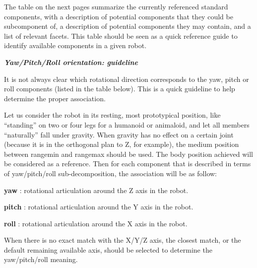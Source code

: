 \documentclass[a4paper]{article}
\begin{document}
{\sffamily
The table on the next pages summarize the currently referenced standard
components, with a description of potential components that they could
be subcomponent of, a description of potential components they may
contain, and a list of relevant facets. This table should be seen as a
quick reference guide to identify available components in a given
robot.}

{\sffamily\bfseries\itshape
Yaw/Pitch/Roll orientation: guideline}

{\sffamily
It is not always clear which rotational direction corresponds to the
yaw, pitch or roll components (listed in the table below). This is a
quick guideline to help determine the proper association. }

{\sffamily
Let us consider the robot in its resting, most prototypical position,
like “standing” on two or four legs for a humanoid or animaloid, and
let all members “naturally” fall under gravity. When gravity has no
effect on a certain joint (because it is in the orthogonal plan to Z,
for example), the medium position between rangemin and rangemax should
be used. The body position achieved will be considered as a reference.
Then for each component that is described in terms of yaw/pitch/roll
sub-decomposition, the association will be as follow:}

{
\textsf{\textbf{ yaw}}\textsf{ : rotational articulation around the Z
axis in the robot.}}

{\sffamily
\textbf{ pitch} : rotational articulation around the Y axis in the
robot.}

{\sffamily
\textbf{ roll} : rotational articulation around the X axis in the
robot.}

{\sffamily
When there is no exact match with the X/Y/Z axis, the closest match, or
the default remaining available axis, should be selected to determine
the yaw/pitch/roll meaning. }
\end{document}

